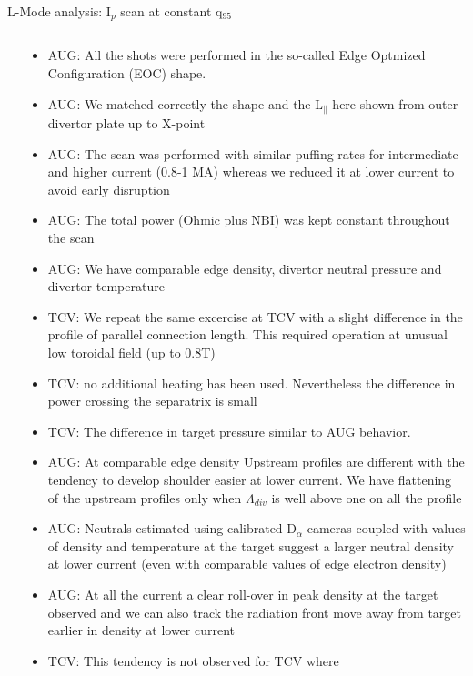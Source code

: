 \documentclass[10pt, compress]{beamer}
\begin{document}
\begin{frame}{L-Mode analysis: I$_p$ scan at constant q$_{95}$}
\begin{columns}
\begin{column}{0.65\textwidth}
  \end{column}
  \begin{column}{0.35\textwidth}
    \begin{itemize}
      \item<1|only@1> AUG: All the shots were performed in the so-called
        Edge Optmized Configuration (EOC) shape. 
      \item<1|only@1> AUG: We matched correctly the shape and the L$_{\parallel}$
        here shown from outer divertor plate up to X-point 
      \item<2|only@2> AUG: The scan was performed with similar puffing
        rates for intermediate and higher current (0.8-1
        MA) whereas we reduced it at lower current to avoid early
        disruption
      \item<2|only@2> AUG: The total power (Ohmic plus NBI) was kept
        constant throughout the scan
      \item<2|only@2> AUG: We have comparable edge density, divertor neutral
        pressure and divertor temperature
      \item<3|only@3> TCV: We repeat the same excercise at TCV with a
        slight difference in the profile of parallel connection
        length. This required operation at unusual low toroidal field
        (up to 0.8T)
      \item<4|only@4> TCV: no additional heating
        has been used. Nevertheless the difference in power crossing the separatrix
        is small
      \item<4|only@4> TCV: The difference in target pressure similar
        to AUG behavior. 
      \item<5|only@5> AUG: At comparable edge density Upstream profiles are
        different with the tendency to develop shoulder easier at
        lower current. \alert{We have flattening of the upstream
          profiles only when $\Lambda_{div}$ is well above one on all
          the profile}
      \item<6|only@6> AUG: Neutrals estimated using calibrated D$_{\alpha}$
        cameras coupled with values of density and temperature at the
        target suggest a larger neutral density at lower current (even
        with comparable values of edge electron density)
      \item<7|only@7> AUG: At all the current a clear roll-over in
        peak density at the target observed and we can also track the radiation
        front move away from target earlier in density at lower current
      \item<8|only@8> TCV: This tendency is not observed for TCV where

\end{itemize}
\end{column}
\end{columns}
\end{frame}
\end{document}

